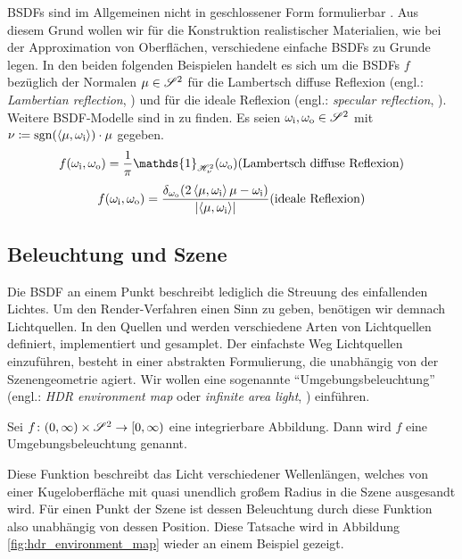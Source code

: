		BSDFs sind im Allgemeinen nicht in geschlossener Form formulierbar \cite[S.~507~f]{pbrt3}.
		Aus diesem Grund wollen wir für die Konstruktion realistischer Materialien, wie bei der Approximation von Oberflächen, verschiedene einfache BSDFs zu Grunde legen.
		In den beiden folgenden Beispielen handelt es sich um die BSDFs $f$ bezüglich der Normalen $\mu\in\mathscr{S}^{2}$ für die Lambertsch diffuse Reflexion (engl.: \textit{Lambertian reflection}, \cite[S.~531~f]{pbrt3}) und für die ideale Reflexion (engl.: \textit{specular reflection}, \cite[S.~144~f]{veach-thesis}).
		Weitere BSDF-Modelle sind in \cite{pbrt3,veach-thesis,radiosity} zu finden.
		Es seien $\omega_{\mathrm{i}},\omega_{\mathrm{o}}\in\mathscr{S}^{2}$ mit $\nu\coloneqq\operatorname{sgn}(\left\langle \mu,\omega_{\mathrm{i}} \right\rangle)\cdot\mu$ gegeben.
		\[
			f(\omega_\m{i},\omega_\m{o}) = \frac{1}{\pi}\mathds{1}_{\shs{\nu}}(\omega_\m{o}) \hfill \text{(Lambertsch diffuse Reflexion)}
		\]
		\[
			f(\omega_\m{i},\omega_\m{o}) = \frac{\delta_{\omega_\m{o}}(2\dotp{\mu}{\omega_\m{i}}\mu - \omega_\m{i})}{\abs{\dotp{\mu}{\omega_\m{i}}}} \hfill \text{(ideale Reflexion)}
		\]


	\subsection{Beleuchtung und Szene} %
	\label{sub:beleuchtung_und_szene}

		Die BSDF an einem Punkt beschreibt lediglich die Streuung des einfallenden Lichtes.
		Um den Render-Verfahren einen Sinn zu geben, benötigen wir demnach Lichtquellen.
		In den Quellen \cite[S.~707~ff]{pbrt3} und \cite{course-photon-map} werden verschiedene Arten von Lichtquellen definiert, implementiert und gesamplet.
		Der einfachste Weg Lichtquellen einzuführen, besteht in einer abstrakten Formulierung, die unabhängig von der Szenengeometrie agiert.
		Wir wollen eine sogenannte \enquote{Umgebungsbeleuchtung} (engl.: \textit{HDR environment map} oder \textit{infinite area light}, \cite[S.~737~f]{pbrt3}) einführen.
		\begin{definition}[Umgebungsbeleuchtung]
			Sei $f\colon(0,\infty)\times\mathscr{S}^{2}\to[0,\infty)$ eine integrierbare Abbildung. Dann wird $f$ eine Umgebungsbeleuchtung genannt.
		\end{definition}

		Diese Funktion beschreibt das Licht verschiedener Wellenlängen, welches von einer Kugeloberfläche mit quasi unendlich großem Radius in die Szene ausgesandt wird.
		Für einen Punkt der Szene ist dessen Beleuchtung durch diese Funktion also unabhängig von dessen Position.
		Diese Tatsache wird in Abbildung \ref{fig:hdr_environment_map} wieder an einem Beispiel gezeigt.

